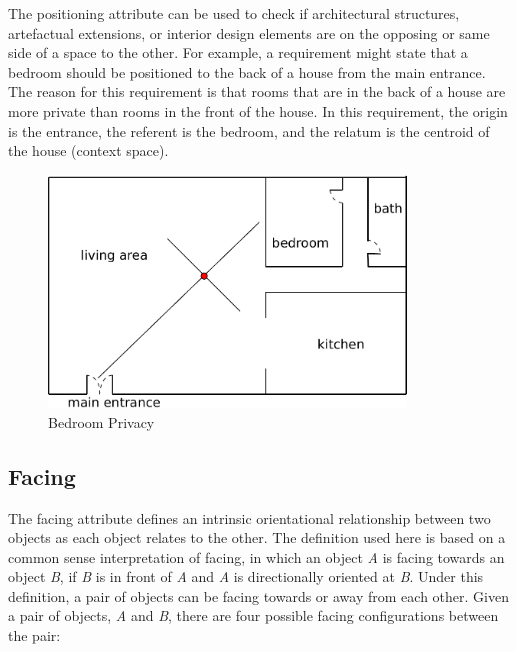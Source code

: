 \documentclass[12pt]{ucthesis}
\begin{document}
The positioning attribute can be used to check if architectural structures, artefactual extensions, or interior design elements are on the opposing or same side of a space to the other. For example, a requirement might state that a bedroom should be positioned to the back of a house from the main entrance. The reason for this requirement is that rooms that are in the back of a house are more private than rooms in the front of the house. In this requirement, the origin is the entrance, the referent is the bedroom, and the relatum is the centroid of the house (context space).

\begin{figure}[H]
 \centering
 \includegraphics[width=95mm]{bedroom-back-house}
 \caption{Bedroom Privacy}
\label{privacy}
\end{figure}


\subsection{Facing}
The facing attribute defines an intrinsic orientational relationship between two objects as each object relates to the other. The definition used here is based on a common sense interpretation of facing, in which an object \emph{A} is facing towards an object \emph{B}, if \emph{B} is in front of \emph{A} and \emph{A} is directionally oriented at \emph{B}. Under this definition, a pair of objects can be facing towards or away from each other. Given a pair of objects, \emph{A} and \emph{B}, there are four possible facing configurations between the pair: 
\end{document}
